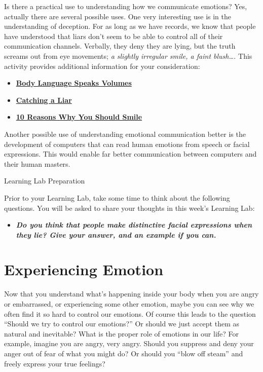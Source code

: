 \documentclass[
]{book}
\providecommand{\tightlist}{%
  \setlength{\itemsep}{0pt}\setlength{\parskip}{0pt}}
\begin{document}
\begin{reflect}
Is there a practical use to understanding how we communicate emotions? Yes, actually there are several possible uses. One very interesting use is in the understanding of deception. For as long as we have records, we know that people have understood that liars don't seem to be able to control all of their communication channels. Verbally, they deny they are lying, but the truth screams out from eye movements; \emph{a slightly irregular smile, a faint blush\ldots.} This activity provides additional information for your consideration:

\begin{itemize}
\tightlist
\item
  \href{http://www.positive-way.com/body.htm}{\textbf{Body Language Speaks Volumes}}\\
\item
  \href{http://www.sciencedaily.com/releases/1999/05/990528003127.htm}{\textbf{Catching a Liar}}\\
\item
  \href{https://www.lifehack.org/358476/10-reasons-you-should-smile-more-often}{\textbf{10 Reasons Why You Should Smile}}
\end{itemize}

Another possible use of understanding emotional communication better is the development of computers that can read human emotions from speech or facial expressions. This would enable far better communication between computers and their human masters.

{Learning Lab Preparation}

Prior to your Learning Lab, take some time to think about the following questions. You will be asked to share your thoughts in this week's Learning Lab:

\begin{itemize}
\tightlist
\item
  \textbf{\emph{Do you think that people make distinctive facial expressions when they lie? Give your answer, and an example if you can.}}
\end{itemize}
\end{reflect}

\hypertarget{experiencing-emotion}{%
\section{Experiencing Emotion}\label{experiencing-emotion}}

Now that you understand what's happening inside your body when you are angry or embarrassed, or experiencing some other emotion, maybe you can see why we often find it so hard to control our emotions. Of course this leads to the question ``Should we try to control our emotions?'' Or should we just accept them as natural and inevitable? What is the proper role of emotions in our life? For example, imagine you are angry, very angry. Should you suppress and deny your anger out of fear of what you might do? Or should you ``blow off steam'' and freely express your true feelings?
\end{document}
